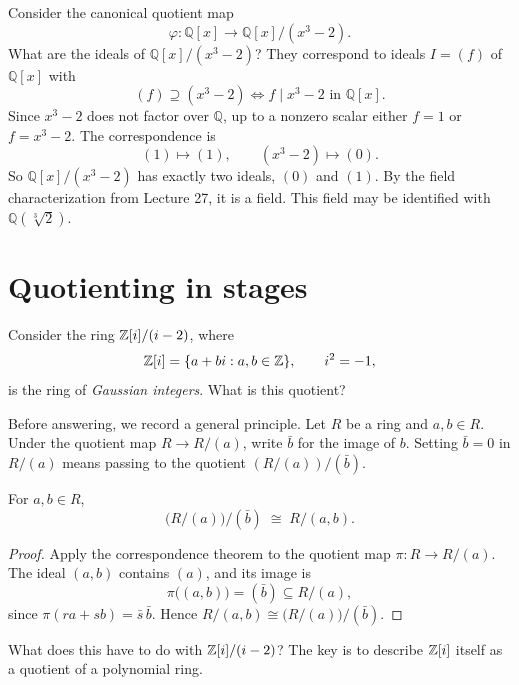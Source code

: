 \documentclass[reqno,11pt]{amsart}
\newcommand{\Q}{\mathbb{Q}}
\begin{document}
\begin{example}[Ideals of $\Q{[x]}/(x^3-2)$]
Consider the canonical quotient map
\[
  \varphi:\Q[x]\to\Q[x]/(x^3-2).
\]
What are the ideals of $\Q[x]/(x^3-2)$? They correspond to ideals
$I=(f)$ of $\Q[x]$ with
\[
  (f)\supseteq(x^3-2)\iff f\mid x^3-2\text{ in }\Q[x].
\]
Since $x^3-2$ does not factor over $\Q$, up to a nonzero scalar
either $f=1$ or $f=x^3-2$. The correspondence is
\[
  (1)\longmapsto(1),\qquad (x^3-2)\longmapsto(0).
\]
So $\Q[x]/(x^3-2)$ has exactly two ideals, $(0)$ and $(1)$. By the
field characterization from Lecture 27, it is a field. This field
may be identified with
$\Q(\sqrt[3]{2})$.
\end{example}

\iffalse
\section{Quotienting in stages}

\begin{example}\label{ex:gaussian-question}
Consider the ring $\mathbb{Z}[i]/(i-2)$, where
\[
  \mathbb{Z}[i]=\{a+bi:a,b\in\mathbb{Z}\},\qquad i^2=-1,
\]
is the ring of \emph{Gaussian integers}. What is this quotient?
\end{example}

Before answering, we record a general principle. Let $R$ be a ring
and $a,b\in R$. Under the quotient map $R\to R/(a)$, write
$\bar b$ for the image of $b$. Setting $\bar b=0$ in $R/(a)$ means
passing to the quotient $(R/(a))/(\bar b)$.

\begin{proposition}\label{prop:stages}
For $a,b\in R$,
\[
  \bigl(R/(a)\bigr)\big/(\bar b)\;\cong\;R/(a,b).
\]
\end{proposition}
\begin{proof}
Apply the correspondence theorem to the quotient map
$\pi:R\to R/(a)$. The ideal $(a,b)$ contains $(a)$, and its image is
\[
  \pi\bigl((a,b)\bigr)=(\bar b)\subseteq R/(a),
\]
since $\pi(ra+sb)=\bar s\,\bar b$. Hence
$R/(a,b)\cong\bigl(R/(a)\bigr)/(\bar b)$.
\end{proof}

What does this have to do with $\mathbb{Z}[i]/(i-2)$? The key is to
describe $\mathbb{Z}[i]$ itself as a quotient of a polynomial ring.
\end{document}
